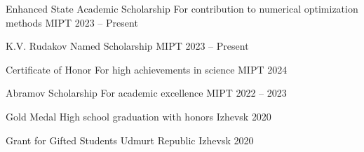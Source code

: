 
\begin{cvhonors}

  \cvhonor
    {Enhanced State Academic Scholarship} %
    {For contribution to numerical optimization methods} %
    {MIPT} %
    {2023 -- Present} %

  \cvhonor
    {K.V. Rudakov Named Scholarship} %
    {} %
    {MIPT} %
    {2023 -- Present} %

  \cvhonor
    {Certificate of Honor} %
    {For high achievements in science} %
    {MIPT} %
    {2024} %

  \cvhonor
    {Abramov Scholarship} %
    {For academic excellence} %
    {MIPT} %
    {2022 -- 2023} %

  \cvhonor
    {Gold Medal} %
    {High school graduation with honors} %
    {Izhevsk} %
    {2020} %

  \cvhonor
    {Grant for Gifted Students} %
    {Udmurt Republic} %
    {Izhevsk} %
    {2020} %

\end{cvhonors}
